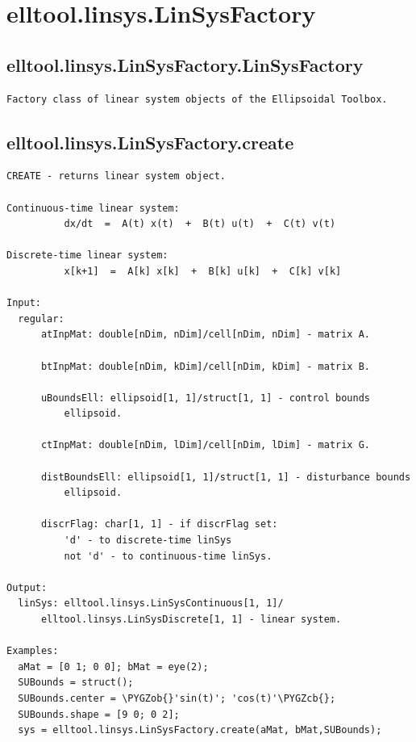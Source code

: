 \documentclass[letterpaper,10pt,english]{sphinxmanual}
\def\PYGZob{\char`\{}
\def\PYGZcb{\char`\}}
\begin{document}
\section{elltool.linsys.LinSysFactory}
\label{chap_functions:elltool-linsys-linsysfactory}

\subsection{elltool.linsys.LinSysFactory.LinSysFactory}
\label{chap_functions:elltool-linsys-linsysfactory-linsysfactory}
\begin{Verbatim}[commandchars=\\\{\}]
Factory class of linear system objects of the Ellipsoidal Toolbox.
\end{Verbatim}


\subsection{elltool.linsys.LinSysFactory.create}
\label{chap_functions:elltool-linsys-linsysfactory-create}
\begin{Verbatim}[commandchars=\\\{\}]
CREATE - returns linear system object.

Continuous-time linear system:
          dx/dt  =  A(t) x(t)  +  B(t) u(t)  +  C(t) v(t)

Discrete-time linear system:
          x[k+1]  =  A[k] x[k]  +  B[k] u[k]  +  C[k] v[k]

Input:
  regular:
      atInpMat: double[nDim, nDim]/cell[nDim, nDim] - matrix A.

      btInpMat: double[nDim, kDim]/cell[nDim, kDim] - matrix B.

      uBoundsEll: ellipsoid[1, 1]/struct[1, 1] - control bounds
          ellipsoid.

      ctInpMat: double[nDim, lDim]/cell[nDim, lDim] - matrix G.

      distBoundsEll: ellipsoid[1, 1]/struct[1, 1] - disturbance bounds
          ellipsoid.

      discrFlag: char[1, 1] - if discrFlag set:
          'd' - to discrete-time linSys
          not 'd' - to continuous-time linSys.

Output:
  linSys: elltool.linsys.LinSysContinuous[1, 1]/
      elltool.linsys.LinSysDiscrete[1, 1] - linear system.

Examples:
  aMat = [0 1; 0 0]; bMat = eye(2);
  SUBounds = struct();
  SUBounds.center = \PYGZob{}'sin(t)'; 'cos(t)'\PYGZcb{};
  SUBounds.shape = [9 0; 0 2];
  sys = elltool.linsys.LinSysFactory.create(aMat, bMat,SUBounds);
\end{Verbatim}
\end{document}
